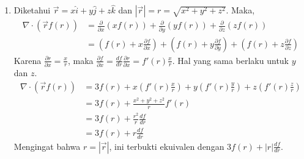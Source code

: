 \documentclass[11pt,letterpaper]{article}
\begin{document}
\begin{enumerate}
  \item Diketahui $\vec{r} = x\hat{i} + y\hat{j} + z\hat{k}$ dan $|\vec{r}| = r = \sqrt{x^2+y^2+z^2}$.
        Maka,
        \begin{align*}
          \nabla \cdot (\vec{r} f(r)) & = \frac{\partial}{\partial x}(x f(r)) + \frac{\partial}{\partial y}(y f(r)) + \frac{\partial}{\partial z}(z f(r))                                                       \\
                                      & = \left( f(r) + x \frac{\partial f}{\partial x} \right) + \left( f(r) + y \frac{\partial f}{\partial y} \right) + \left( f(r) + z \frac{\partial f}{\partial z} \right)
        \end{align*}
        Karena $\frac{\partial r}{\partial x} = \frac{x}{r}$, maka $\frac{\partial f}{\partial x} = \frac{df}{dr} \frac{\partial r}{\partial x} = f'(r) \frac{x}{r}$. Hal yang sama berlaku untuk $y$ dan $z$.
        \begin{align*}
          \nabla \cdot (\vec{r} f(r)) & = 3f(r) + x \left( f'(r) \frac{x}{r} \right) + y \left( f'(r) \frac{y}{r} \right) + z \left( f'(r) \frac{z}{r} \right) \\
                                      & = 3f(r) + \frac{x^2+y^2+z^2}{r} f'(r)                                                                                  \\
                                      & = 3f(r) + \frac{r^2}{r} \frac{df}{dr}                                                                                  \\
                                      & = 3f(r) + r \frac{df}{dr}
        \end{align*}
        Mengingat bahwa $r = |\vec{r}|$, ini terbukti ekuivalen dengan $3f(r) + |r|\frac{df}{dr}$.
\end{enumerate}
\end{document}
